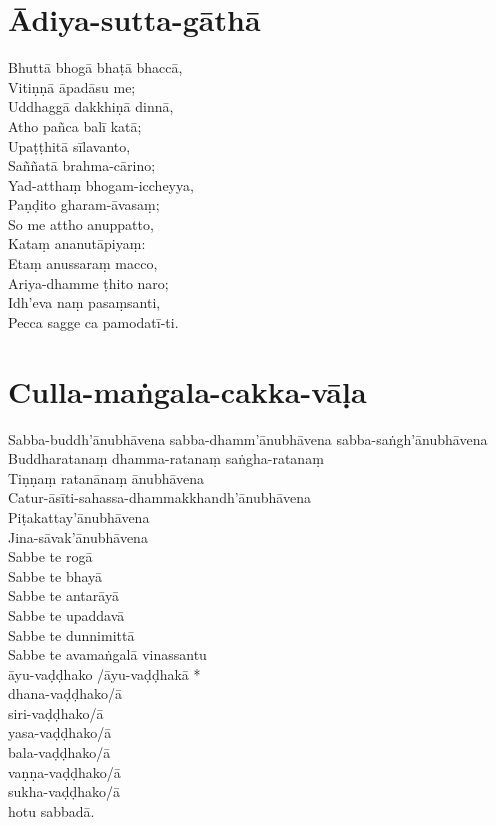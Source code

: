 \chapter{Ādiya-sutta-gāthā}

Bhuttā bhogā bhaṭā bhaccā,\\
Vitiṇṇā āpadāsu me;\\
Uddhaggā dakkhiṇā dinnā,\\
Atho pañca balī katā;\\
Upaṭṭhitā sīlavanto,\\
Saññatā brahma-cārino;\\
Yad-atthaṃ bhogam-iccheyya,\\
Paṇḍito gharam-āvasaṃ;\\
So me attho anuppatto,\\
Kataṃ ananutāpiyaṃ:\\
Etaṃ anussaraṃ macco,\\
Ariya-dhamme ṭhito naro;\\
Idh'eva naṃ pasaṃsanti,\\
Pecca sagge ca pamodatī-ti.

\chapter{Culla-maṅgala-cakka-vāḷa}

Sabba-buddh'ānubhāvena sabba-dhamm'ānubhāvena sabba-saṅgh'ānubhāvena Buddharatanaṃ dhamma-ratanaṃ saṅgha-ratanaṃ\\
Tiṇṇaṃ ratanānaṃ ānubhāvena\\
Catur-āsīti-sahassa-dhammakkhandh'ānubhāvena\\
Piṭakattay'ānubhāvena\\
Jina-sāvak'ānubhāvena\\
Sabbe te rogā\\
Sabbe te bhayā\\
Sabbe te antarāyā\\
Sabbe te upaddavā\\
Sabbe te dunnimittā\\
Sabbe te avamaṅgalā vinassantu\\
āyu-vaḍḍhako /āyu-vaḍḍhakā *\\
dhana-vaḍḍhako/ā\\
siri-vaḍḍhako/ā\\
yasa-vaḍḍhako/ā\\
bala-vaḍḍhako/ā\\
vaṇṇa-vaḍḍhako/ā\\
sukha-vaḍḍhako/ā\\
hotu sabbadā.

